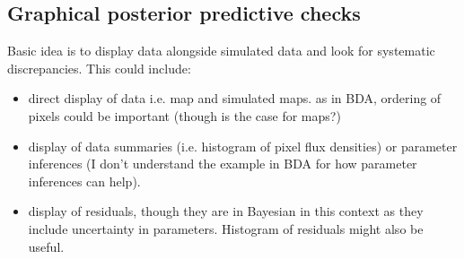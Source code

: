 \documentclass[a4paper,11pt]{article}
\begin{document}
\subsection{Graphical posterior predictive checks}
Basic idea is to display data alongside simulated data and look for systematic discrepancies. This could include:
\begin{itemize}
\item direct display of data i.e. map and simulated maps. as in BDA, ordering of pixels could be important (though is the case for maps?)
\item display of data summaries (i.e. histogram of pixel flux densities) or parameter inferences (I don't understand the example in BDA for how parameter inferences can help).
\item display of residuals, though they are in Bayesian in this context as they include uncertainty in parameters. Histogram of residuals might also be useful.
\end{itemize}

 
 
 
\end{document}
